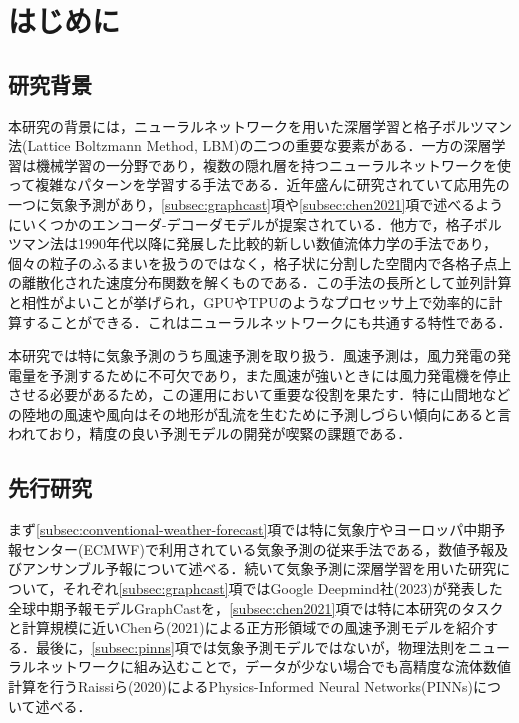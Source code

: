 \chapter{はじめに \label{chap:introduction}}

\section{研究背景}
本研究の背景には，ニューラルネットワークを用いた深層学習と格子ボルツマン法(Lattice Boltzmann Method, LBM)の二つの重要な要素がある．一方の深層学習は機械学習の一分野であり，複数の隠れ層を持つニューラルネットワークを使って複雑なパターンを学習する手法である\cite{doi:10.1126/science.1127647}．近年盛んに研究されていて応用先の一つに気象予測があり\cite{Schultz2021}，\ref{subsec:graphcast}項や\ref{subsec:chen2021}項で述べるようにいくつかのエンコーダ-デコーダモデルが提案されている．他方で，格子ボルツマン法は1990年代以降に発展した比較的新しい数値流体力学の手法であり，個々の粒子のふるまいを扱うのではなく，格子状に分割した空間内で各格子点上の離散化された速度分布関数を解くものである\cite{doi:10.1146/annurev.fluid.30.1.329}．この手法の長所として並列計算と相性がよいことが挙げられ，GPUやTPUのようなプロセッサ上で効率的に計算することができる\cite{Satofuka1999}．これはニューラルネットワークにも共通する特性である\cite{OH20041311}．

本研究では特に気象予測のうち風速予測を取り扱う．風速予測は，風力発電の発電量を予測するために不可欠であり，また風速が強いときには風力発電機を停止させる必要があるため，この運用において重要な役割を果たす．特に山間地などの陸地の風速や風向はその地形が乱流を生むために予測しづらい傾向にあると言われており\cite{YAN2022112519}，精度の良い予測モデルの開発が喫緊の課題である．

\section{先行研究 \label{sec:previous-studies}}
まず\ref{subsec:conventional-weather-forecast}項では特に気象庁やヨーロッパ中期予報センター(ECMWF)で利用されている気象予測の従来手法である，数値予報及びアンサンブル予報について述べる．続いて気象予測に深層学習を用いた研究について，それぞれ\ref{subsec:graphcast}項ではGoogle Deepmind社(2023)が発表した全球中期予報モデルGraphCastを，\ref{subsec:chen2021}項では特に本研究のタスクと計算規模に近いChenら(2021)による正方形領域での風速予測モデルを紹介する．最後に，\ref{subsec:pinns}項では気象予測モデルではないが，物理法則をニューラルネットワークに組み込むことで，データが少ない場合でも高精度な流体数値計算を行うRaissiら(2020)によるPhysics-Informed Neural Networks(PINNs)について述べる．

